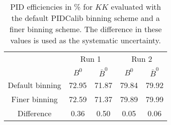 \begin{table}
    \centering
    \begin{tabular}{ccccc}
    \toprule
& \multicolumn{2}{c}{Run 1} & \multicolumn{2}{c}{Run 2}\\
& $B^0$ & $\bar{B}^0$ & $B^0$ & $\bar{B}^0$\\
    \midrule
Default binning & 72.95 & 71.87 & 79.84 & 79.92\\
Finer binning & 72.59 & 71.37 & 79.89 & 79.99\\
Difference & 0.36 & 0.50 & 0.05 & 0.06\\
    \bottomrule
    \end{tabular}
    \caption{PID efficiencies in \% for $KK$ evaluated with the default PIDCalib binning scheme and a finer binning scheme. The difference in these values is used as the systematic uncertainty.}
\label{tab:final_PID_KK}
\end{table}
